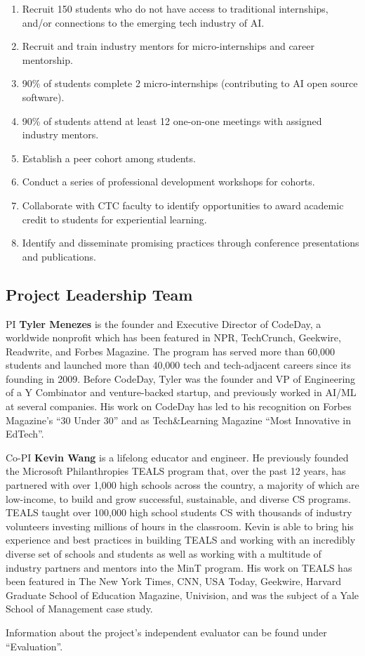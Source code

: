 \begin{enumerate}
    \item Recruit 150 students who do not have access to traditional internships, and/or connections to the emerging tech industry of AI.
    \item Recruit and train industry mentors for micro-internships and career mentorship.
    \item 90\% of students complete 2 micro-internships (contributing to AI open source software).
    \item 90\% of students attend at least 12 one-on-one meetings with assigned industry mentors.
    \item Establish a peer cohort among students.
    \item Conduct a series of professional development workshops for cohorts.
    \item Collaborate with CTC faculty to identify opportunities to award academic credit to students for experiential learning.
    \item Identify and disseminate promising practices through conference presentations and publications.
\end{enumerate}

\subsection{Project Leadership Team}

PI \textbf{Tyler Menezes} is the founder and Executive Director of CodeDay, a worldwide nonprofit which has been featured in NPR, TechCrunch, Geekwire, Readwrite, and Forbes Magazine. The program has served more than 60,000 students and launched more than 40,000 tech and tech-adjacent careers since its founding in 2009. Before CodeDay, Tyler was the founder and VP of Engineering of a Y Combinator and venture-backed startup, and previously worked in AI/ML at several companies. His work on CodeDay has led to his recognition on Forbes Magazine’s “30 Under 30” and as Tech\&Learning Magazine “Most Innovative in EdTech”.

Co-PI \textbf{Kevin Wang} is a lifelong educator and engineer. He previously founded the Microsoft Philanthropies TEALS program that, over the past 12 years, has partnered with over 1,000 high schools across the country, a majority of which are low-income, to build and grow successful, sustainable, and diverse CS programs. TEALS taught over 100,000 high school students CS with thousands of industry volunteers investing millions of hours in the classroom. Kevin is able to bring his experience and best practices in building TEALS and working with an incredibly diverse set of schools and students as well as working with a multitude of industry partners and mentors into the MinT program. His work on TEALS has been featured in The New York Times, CNN, USA Today, Geekwire, Harvard Graduate School of Education Magazine, Univision, and was the subject of a Yale School of Management case study.

Information about the project's independent evaluator can be found under ``Evaluation''.